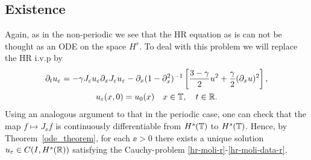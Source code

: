 \subsection{Existence}
Again, as in the non-periodic we see that the HR equation as is can not be thought as an ODE on the space $H^s$. To
deal with this problem we will replace the HR i.v.p by  
\begin{gather}
  \label{hr-moli-r}
\partial_t  u_\varepsilon =
-\gamma J_\varepsilon u_\varepsilon \partial_x  J_\varepsilon  u_\varepsilon - \partial_x (1-\partial_x^2)^{-1} 
\left[\frac{3-\gamma}{2}u^2 + \frac{\gamma}{2}(\partial_x u)^2 \right],
\\
u_\varepsilon(x, 0) = u_0 (x) \quad x \in \mathbb{T}, \quad t \in \mathbb{R}.
\label{hr-moli-data-r}
\end{gather}
%
Using an analogous argument to that in the periodic case, one can check that the map $f \mapsto J_{\ee} f$ is continuously differentiable from $H^s(\mathbb{T})$
to $H^s(\mathbb{T})$.  Hence, by Theorem~\ref{ode_theorem}, for each $\ee > 0$ there exists a
unique solution $u_\varepsilon \in C(I, H^s(\mathbb{R}))$ satisfying the Cauchy-problem
\eqref{hr-moli-r}-\eqref{hr-moli-data-r}. 
%
